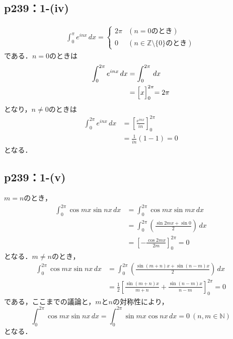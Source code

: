 \documentclass[a4paper,10pt,fleqn]{ltjsarticle}
\begin{document}
\subsection*{p239：1-(iv)}
\begin{screen}
    \begin{align*}
        \int_{0}^{\pi} e^{inx} \, dx  =
        \begin{cases}
            2 \pi & (n=0 のとき)                             \\
            0     & (n \in \mathbb{Z}\setminus \{0\} のとき)
        \end{cases}
    \end{align*}
    である．$n=0$のときは
    \begin{align*}
        \int_{0}^{2 \pi} e^{inx} \, dx & = \int_{0}^{2\pi} \, dx           \\
                                       & = \Bigl[x\Bigl]_{0}^{2\pi} = 2\pi
    \end{align*}
    となり，$n \ne 0$のときは
    \begin{align*}
        \int_{0}^{2\pi} e^{inx} \, dx & = \left [\frac{e^{inx}}{in} \right ]_{0}^{2\pi} \\
                                      & = \frac{1}{in} (1-1)=0
    \end{align*}
    となる．
\end{screen}


\subsection*{p239：1-(v)}

\begin{screen}
    $m=n$のとき，
    \begin{align*}
        \int_{0}^{2\pi} \cos m x \sin nx \, dx & = \int_{0}^{2\pi} \cos mx \sin mx \, dx                            \\
                                               & = \int_{0}^{2\pi} \left (\frac{\sin 2mx + \sin 0}{2}\right ) \, dx \\
                                               & = \left [-\frac{\cos 2mx}{2m}\right ]_{0}^{2\pi} =0
    \end{align*}
    となる．$m \ne n$のとき，
    \begin{align*}
        \int_{0}^{2\pi} \cos mx \sin nx \, dx & = \int_{0}^{2\pi} \left (\frac{\sin (m+n)x + \sin (n-m)x}{2}\right) \, dx                 \\
                                              & = \frac{1}{2}\left [\frac{\sin (m+n)x}{m+n}+\frac{\sin (n-m)x}{n-m} \right]_{0}^{2\pi} =0
    \end{align*}
    である，ここまでの議論と，$m$と$n$の対称性により，
    \[
        \int_{0}^{2\pi} \cos mx \sin nx \, dx =\int_{0}^{2\pi} \sin mx \cos nx \, dx =0 ~(n,m \in \mathbb{N})
    \]
    となる．
\end{screen}
\end{document}
